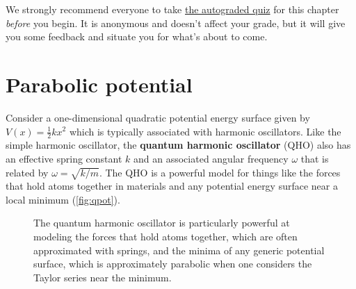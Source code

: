 \begin{tcolorbox}[colframe=PaloAlto, colbacktitle=PaloAlto!20!white, title=Self-check quiz]
	We strongly recommend everyone to take \href{https://forms.gle/GYa2V1pGq7MBqhi99}{the autograded quiz} for this chapter \emph{before} you begin.
	It is anonymous and doesn't affect your grade, but it will give you some feedback and situate you for what's about to come.
\end{tcolorbox}



\section{Parabolic potential}

Consider a one-dimensional quadratic potential energy surface given by $V(x) = \frac{1}{2} kx^2$ which is typically associated with harmonic oscillators. 
Like the simple harmonic oscillator, the \textbf{quantum harmonic oscillator} (QHO) also has an effective spring constant $k$ and an associated angular frequency $\omega$ that is related by $\omega = \sqrt{k/m}$. 
The QHO is a powerful model for things like the forces that hold atoms together in materials and any potential energy surface near a local minimum (\autoref{fig:qpot}).

\begin{figure}[!h]
	\centering
	 \hspace{4ex}
	\caption{The quantum harmonic oscillator is particularly powerful at modeling \protect{} the forces that hold atoms together, which are often approximated with springs, and 
	\protect{} the minima of any generic potential surface, which is approximately parabolic when one considers the Taylor series near the minimum.}
	\label{fig:qpot}
\end{figure}



